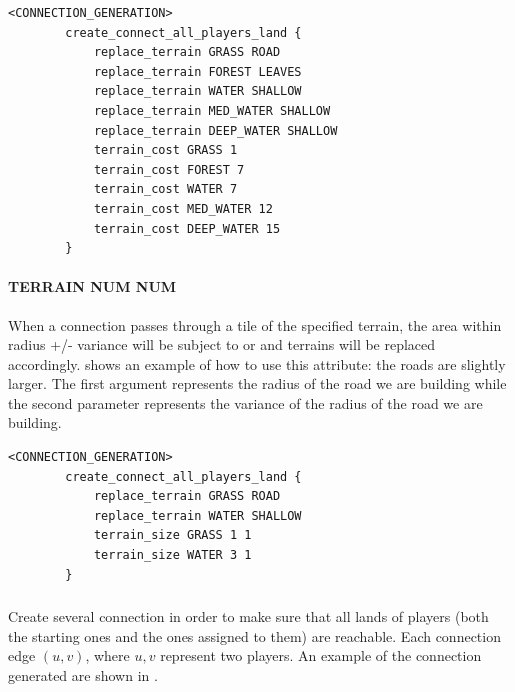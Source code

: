     \begin{lstlisting}[language={rms},label={lst:replacecost}]
        <CONNECTION_GENERATION>
        create_connect_all_players_land {
            replace_terrain GRASS ROAD
            replace_terrain FOREST LEAVES
            replace_terrain WATER SHALLOW
            replace_terrain MED_WATER SHALLOW
            replace_terrain DEEP_WATER SHALLOW
            terrain_cost GRASS 1
            terrain_cost FOREST 7
            terrain_cost WATER 7
            terrain_cost MED_WATER 12
            terrain_cost DEEP_WATER 15
        }
    \end{lstlisting}

    \paragraph{ TERRAIN NUM NUM}

    When a connection passes through a tile of the specified terrain, the area within radius +/- variance will be subject to  or  and terrains will be replaced accordingly.  shows an example of how to use this attribute: the roads are slightly larger. The first argument represents the radius of the road we are building while the second parameter represents the variance of the radius of the road we are building.

    \begin{lstlisting}[language={rms},label={lst:terrainsize}]
        <CONNECTION_GENERATION>
        create_connect_all_players_land {
            replace_terrain GRASS ROAD
            replace_terrain WATER SHALLOW
            terrain_size GRASS 1 1
            terrain_size WATER 3 1
        }
    \end{lstlisting}

    \subsubsection{}

    Create several connection in order to make sure that all lands of players (both the starting ones and the ones assigned to them) are reachable. Each connection edge $(u,v)$, where $u,v$ represent two players. An example of the connection generated are shown in .

